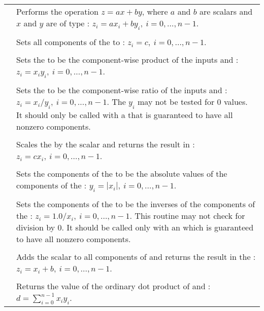 \begin{supertabular}{|p{\colone}|p{\coltwo}|}
& Performs the operation $z = a x + b y$, where $a$ and $b$ are scalars
and $x$ and $y$ are of type :
$z_i = a x_i + b y_i, \: i=0,\ldots,n-1$.
\\[2mm]
 &  \\
& Sets all components of the   to :
$z_i = c,\: i=0,\ldots,n-1$.
\\[2mm]
 &  \\
& Sets the   to be the component-wise product of the
 inputs  and :
$z_i = x_i y_i,\: i=0,\ldots,n-1$.
\\[2mm]
 &  \\
& Sets the   to be the component-wise ratio of the
 inputs  and :
$z_i = x_i / y_i,\: i=0,\ldots,n-1$. The $y_i$ may not be tested 
for $0$ values. It should only be called with a  that is
guaranteed to have all nonzero components.
\\[2mm]
 &  \\
& Scales the   by the scalar  and returns
the result in :
$z_i = c x_i , \: i=0,\ldots,n-1$.
\\[2mm]
 &  \\
& Sets the components of the   to be the absolute
values of the components of the  :
$y_i = | x_i | , \: i=0,\ldots,n-1$.
\\[2mm]
 &  \\
& Sets the components of the   to be the inverses
of the components of the  :
$z_i = 1.0 /  x_i  , \: i=0,\ldots,n-1$. This routine
may not check for division by $0$. It should be called only with an 
 which is guaranteed to have all nonzero components.
\\[2mm]
 &  \\
& Adds the scalar  to all components of  and returns the
result in the  :
$z_i = x_i + b , \: i=0,\ldots,n-1$.
\\[2mm]
 &  \\
& Returns the value of the ordinary dot product of  and :
$d=\sum_{i=0}^{n-1} x_i y_i$.
\\[2mm]

\end{supertabular}
